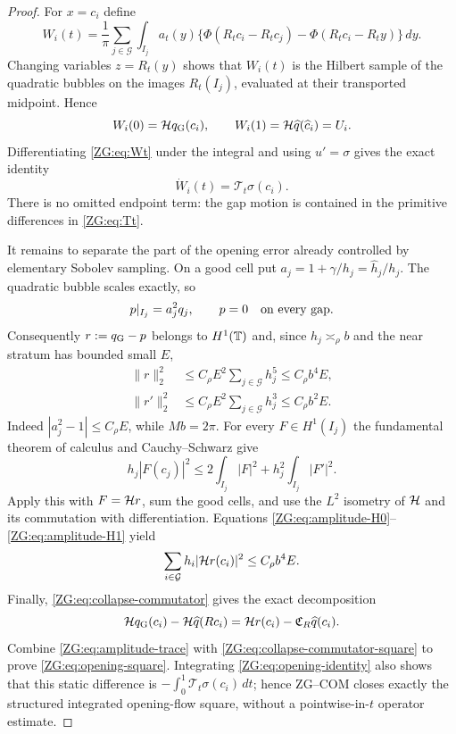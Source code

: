 \begin{proof}
For $x=c_i$ define
\begin{equation}\label{ZG:eq:Wt}
 W_i(t)=\frac1\pi\sum_{j\in\mathcal G}\int_{I_j}a_t(y)
 \{\Phi(R_tc_i-R_tc_j)-\Phi(R_tc_i-R_ty)\}\,dy.
\end{equation}
Changing variables $z=R_t(y)$ shows that $W_i(t)$ is the Hilbert
sample of the quadratic bubbles on the images $R_t(I_j)$, evaluated at
their transported midpoint.  Hence
\[
 W_i(0)=\mathcal H q_{\rm G}(c_i),
 \qquad W_i(1)=\mathcal H\widehat q(\widehat c_i)=U_i.
\]
Differentiating \eqref{ZG:eq:Wt} under the integral and using $u'=\sigma$
gives the exact identity
\begin{equation}\label{ZG:eq:opening-identity}
 \dot W_i(t)=\mathcal T_t\sigma(c_i).
\end{equation}
There is no omitted endpoint term: the gap motion is contained in the
primitive differences in \eqref{ZG:eq:Tt}.

It remains to separate the part of the opening error already controlled
by elementary Sobolev sampling.  On a good cell put
$a_j=1+\gamma/h_j=\widehat h_j/h_j$.  The quadratic bubble scales
exactly, so
\begin{equation}\label{ZG:eq:pullback-bubble}
 p|_{I_j}=a_j^2q_j,
 \qquad p=0\quad\hbox{on every gap}.
\end{equation}
Consequently $r:=q_{\rm G}-p$ belongs to $H^1(\mathbb T)$ and, since
$h_j\asymp_\rho b$ and the near stratum has bounded small $E$,
\begin{align}
 \|r\|_2^2
 &\le C_\rho E^2\sum_{j\in\mathcal G}h_j^5
 \le C_\rho b^4E,\label{ZG:eq:amplitude-H0}\\
 \|r'\|_2^2
 &\le C_\rho E^2\sum_{j\in\mathcal G}h_j^3
 \le C_\rho b^2E.\label{ZG:eq:amplitude-H1}
\end{align}
Indeed $|a_j^2-1|\le C_\rho E$, while
$Mb=2\pi$.  For every $F\in H^1(I_j)$ the fundamental theorem of
calculus and Cauchy--Schwarz give
\[
 h_j|F(c_j)|^2
 \le2\int_{I_j}|F|^2+h_j^2\int_{I_j}|F'|^2.
\]
Apply this with $F=\mathcal H r$, sum the good cells, and use the $L^2$
isometry of $\mathcal H$ and its commutation with differentiation.  Equations
\eqref{ZG:eq:amplitude-H0}--\eqref{ZG:eq:amplitude-H1} yield
\begin{equation}\label{ZG:eq:amplitude-trace}
 \sum_{i\in\mathcal G}h_i|\mathcal H r(c_i)|^2
 \le C_\rho b^4E.
\end{equation}
Finally, \eqref{ZG:eq:collapse-commutator} gives the exact decomposition
\[
 \mathcal H q_{\rm G}(c_i)-\mathcal H\widehat q(Rc_i)
 =\mathcal H r(c_i)-\mathfrak C_R\widehat q(c_i).
\]
Combine \eqref{ZG:eq:amplitude-trace} with
\eqref{ZG:eq:collapse-commutator-square} to prove
\eqref{ZG:eq:opening-square}.  Integrating
\eqref{ZG:eq:opening-identity} also shows that this static difference is
$-\int_0^1\mathcal T_t\sigma(c_i)\,dt$; hence ZG--COM closes exactly the
structured integrated opening-flow square, without a pointwise-in-$t$
operator estimate.

\end{proof}

